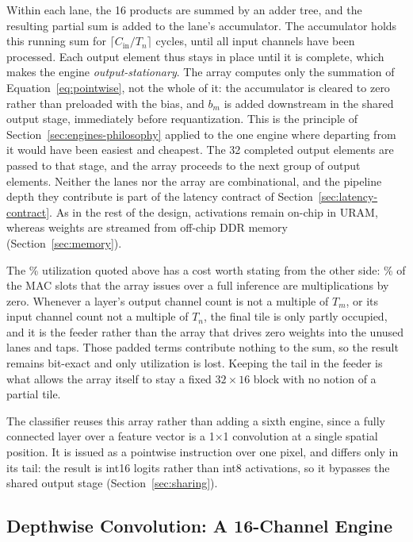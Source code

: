 Within each lane, the 16 products are summed by an adder tree, and the
resulting partial sum is added to the lane's accumulator. The accumulator holds
this running sum for $\lceil C_{\mathrm{in}} / T_n \rceil$ cycles, until all
input channels have been processed. Each output element thus stays in place
until it is complete, which makes the engine \emph{output-stationary}. The
array computes only the summation of Equation~\eqref{eq:pointwise}, not the
whole of it: the accumulator is cleared to zero rather than preloaded with the
bias, and $b_m$ is added downstream in the shared output stage, immediately
before requantization. This is the principle of
Section~\ref{sec:engines-philosophy} applied to the one engine where departing
from it would have been easiest and cheapest. The 32 completed output elements
are passed to that stage, and the array proceeds to the next group of output
elements. Neither the lanes nor the array are combinational, and the pipeline
depth they contribute is part of the latency contract of
Section~\ref{sec:latency-contract}. As in the rest of the design, activations
remain on-chip in URAM, whereas weights are streamed from off-chip DDR memory
(Section~\ref{sec:memory}).

The \thPwUtil\% utilization quoted above has a cost worth stating from the
other side: \thPwWastePct\% of the MAC slots that the array issues over a full
inference are multiplications by zero. Whenever a layer's output channel count
is not a multiple of $T_m$, or its input channel count not a multiple of $T_n$,
the final tile is only partly occupied, and it is the feeder rather than the
array that drives zero weights into the unused lanes and taps. Those padded
terms contribute nothing to the sum, so the result remains bit-exact and only
utilization is lost. Keeping the tail in the feeder is what allows the array
itself to stay a fixed $32 \times 16$ block with no notion of a partial tile.

The classifier reuses this array rather than adding a sixth engine, since a
fully connected layer over a feature vector is a 1$\times$1 convolution at a
single spatial position. It is issued as a pointwise instruction over one
pixel, and differs only in its tail: the result is int16 logits rather than
int8 activations, so it bypasses the shared output stage
(Section~\ref{sec:sharing}).

\subsection{Depthwise Convolution: A 16-Channel Engine}
\label{sec:dw-engine}

